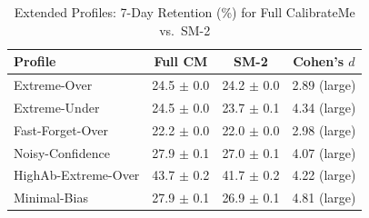 \begin{table}[t]
\centering
\scriptsize
\setlength{\tabcolsep}{3pt}
\caption{Extended Profiles: 7-Day Retention (\%) for Full CalibrateMe vs.\ SM-2}
\label{tab:extended}
\begin{tabular}{lccc}
\toprule
\textbf{Profile} & \textbf{Full CM} & \textbf{SM-2} & \textbf{Cohen's $d$} \\
\midrule
Extreme-Over & 24.5 $\pm$ 0.0 & 24.2 $\pm$ 0.0 & 2.89 (large) \\
Extreme-Under & 24.5 $\pm$ 0.0 & 23.7 $\pm$ 0.1 & 4.34 (large) \\
Fast-Forget-Over & 22.2 $\pm$ 0.0 & 22.0 $\pm$ 0.0 & 2.98 (large) \\
Noisy-Confidence & 27.9 $\pm$ 0.1 & 27.0 $\pm$ 0.1 & 4.07 (large) \\
HighAb-Extreme-Over & 43.7 $\pm$ 0.2 & 41.7 $\pm$ 0.2 & 4.22 (large) \\
Minimal-Bias & 27.9 $\pm$ 0.1 & 26.9 $\pm$ 0.1 & 4.81 (large) \\
\bottomrule
\end{tabular}
\end{table}
